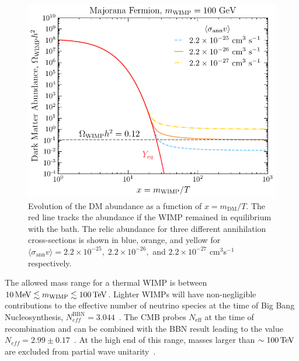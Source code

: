 \begin{figure}[t!]
    \centering
    \includegraphics{fig_dm_freezeout.pdf}
    \caption{Evolution of the DM abundance as a function of $x = m_\mathrm{DM}/T$. The red line tracks the abundance if the WIMP remained in equilibrium with the bath. The relic abundance for three different annihilation cross-sections is shown in blue, orange, and yellow for $\langle \sigma_\mathrm{ann} v\rangle = 2.2\times10^{-25},\;2.2\times10^{-26},$ and $2.2\times10^{-27}$ cm$^{3}$s$^{-1}$ respectively.}
    \label{fig:WIMP_freezeout}
\end{figure}

The allowed mass range for a thermal WIMP is between $10{\rm \,MeV}\lesssim m_\mathrm{WIMP} \lesssim 100{\rm \,TeV}$. Lighter WIMPs will have non-negligible contributions to the effective number of neutrino species at the time of Big Bang Nucleosynthesis, $N^\mathrm{BBN}_{eff} = 3.044$~\cite{Yeh:2022heq_oct_Probingphysicsstandard}. The CMB probes $N_\mathrm{eff}$ at the time of recombination and can be combined with the BBN result leading to the value $N_{eff} = 2.99 \pm 0.17$~\cite{Planck:2018vyg_sep_Planck2018results}. 
At the high end of this range, masses larger than $\sim 100{\rm \,TeV}$ are excluded from partial wave unitarity~\cite{Griest:1989wd_UnitarityLimitsMass}. 
 

